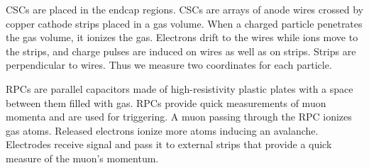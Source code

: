 
CSCs are placed in the endcap regions. CSCs are arrays of anode wires crossed by copper cathode strips placed in a gas volume. When a charged particle penetrates the gas volume, it ionizes the gas. Electrons drift to the wires while ions move to the strips, and charge pulses are induced on wires as well as on strips. Strips are perpendicular to wires. Thus we measure two coordinates for each particle.  

RPCs are parallel capacitors made of high-resistivity plastic plates with a space between them filled with gas. RPCs provide quick measurements of muon momenta and are used for triggering. A muon passing through the RPC ionizes gas atoms. Released electrons ionize more atoms inducing an avalanche. Electrodes receive signal and pass it to external strips that provide a quick measure of the muon's momentum. 


